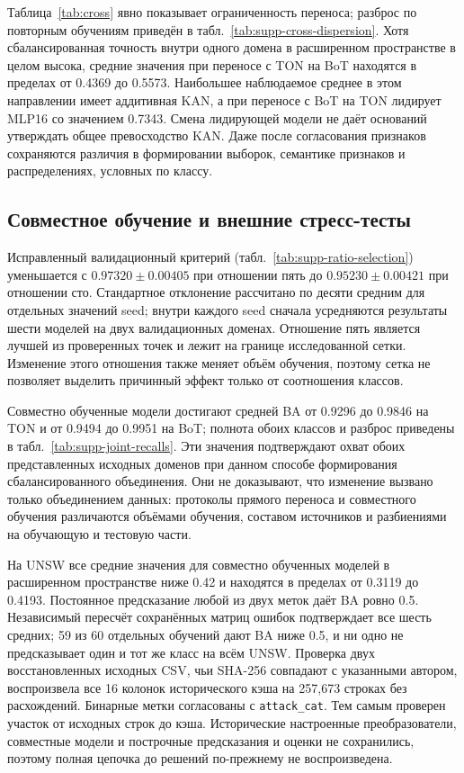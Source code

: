 Таблица~\ref{tab:cross} явно показывает ограниченность переноса; разброс по повторным обучениям приведён в табл.~\ref{tab:supp-cross-dispersion}. Хотя сбалансированная точность внутри одного домена в расширенном пространстве в целом высока, средние значения при переносе с TON на BoT находятся в пределах от 0.4369 до 0.5573. Наибольшее наблюдаемое среднее в этом направлении имеет аддитивная KAN, а при переносе с BoT на TON лидирует MLP16 со значением 0.7343. Смена лидирующей модели не даёт оснований утверждать общее превосходство KAN. Даже после согласования признаков сохраняются различия в формировании выборок, семантике признаков и распределениях, условных по классу.

\subsection{Совместное обучение и внешние стресс-тесты}
Исправленный валидационный критерий (табл.~\ref{tab:supp-ratio-selection}) уменьшается с $0.97320\pm0.00405$ при отношении пять до $0.95230\pm0.00421$ при отношении сто. Стандартное отклонение рассчитано по десяти средним для отдельных значений seed; внутри каждого seed сначала усредняются результаты шести моделей на двух валидационных доменах. Отношение пять является лучшей из проверенных точек и лежит на границе исследованной сетки. Изменение этого отношения также меняет объём обучения, поэтому сетка не позволяет выделить причинный эффект только от соотношения классов.

Совместно обученные модели достигают средней BA от 0.9296 до 0.9846 на TON и от 0.9494 до 0.9951 на BoT; полнота обоих классов и разброс приведены в табл.~\ref{tab:supp-joint-recalls}. Эти значения подтверждают охват обоих представленных исходных доменов при данном способе формирования сбалансированного объединения. Они не доказывают, что изменение вызвано только объединением данных: протоколы прямого переноса и совместного обучения различаются объёмами обучения, составом источников и разбиениями на обучающую и тестовую части.

На UNSW все средние значения для совместно обученных моделей в расширенном пространстве ниже 0.42 и находятся в пределах от 0.3119 до 0.4193. Постоянное предсказание любой из двух меток даёт BA ровно 0.5. Независимый пересчёт сохранённых матриц ошибок подтверждает все шесть средних; 59 из 60 отдельных обучений дают BA ниже 0.5, и ни одно не предсказывает один и тот же класс на всём UNSW. Проверка двух восстановленных исходных CSV, чьи SHA-256 совпадают с указанными автором, воспроизвела все 16 колонок исторического кэша на 257,673 строках без расхождений. Бинарные метки согласованы с \texttt{attack\_cat}. Тем самым проверен участок от исходных строк до кэша. Исторические настроенные преобразователи, совместные модели и построчные предсказания и оценки не сохранились, поэтому полная цепочка до решений по-прежнему не воспроизведена.

